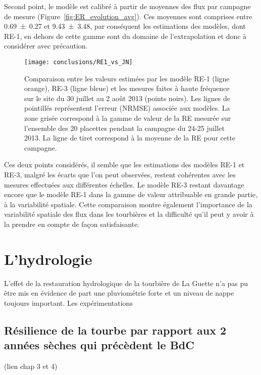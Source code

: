 Second point, le modèle est calibré à partir de moyennes des flux par campagne de mesure (Figure~\ref{fig:ER_evolution_avg}).
Ces moyennes sont comprises entre \num{0.69(027)} et \SI{9.43(348)}{\uml}, par conséquent les estimations des modèles, dont RE-1, en dehors de cette gamme sont du domaine de l'extrapolation et donc à considérer avec précaution.

\begin{figure}
\centering
\texttt{[image: conclusions/RE1\_vs\_JN]}
\caption{Comparaison entre les valeurs estimées par les modèle RE-1 (ligne orange), RE-3 (ligne bleue) et les mesures faites à haute fréquence sur le site du 30 juillet au 2 août 2013 (points noirs). Les lignes de pointillés représentent l'erreur (NRMSE) associée aux modèles. La zone grisée correspond à la gamme de valeur de la RE mesurée sur l'ensemble des 20 placettes pendant la campagne du 24-25 juillet 2013. La ligne de tiret correspond à la moyenne de la RE pour cette campagne.}
\label{fig:RE1_vs_JN}
\end{figure}

Ces deux points considérés, il semble que les estimations des modèles RE-1 et RE-3, malgré les écarts que l'on peut observées, restent cohérentes avec les mesures effectuées aux différentes échelles.
Le modèle RE-3 restant davantage encore que le modèle RE-1 dans la gamme de valeur attribuable en grande partie, à la variabilité spatiale.
Cette comparaison montre également l'importance de la variabilité spatiale des flux dans les tourbières et la difficulté qu'il peut y avoir à la prendre en compte de façon satisfaisante.



\section*{L'hydrologie}

L'effet de la restauration hydrologique de la tourbière de La Guette n'a pas pu être mis en évidence de part une pluviométrie forte et un niveau de nappe toujours important.
Les expérimentations

\subsection*{Résilience de la tourbe par rapport aux 2 années sèches qui précèdent le BdC}
(lien chap 3 et 4)

%
%
%
%


